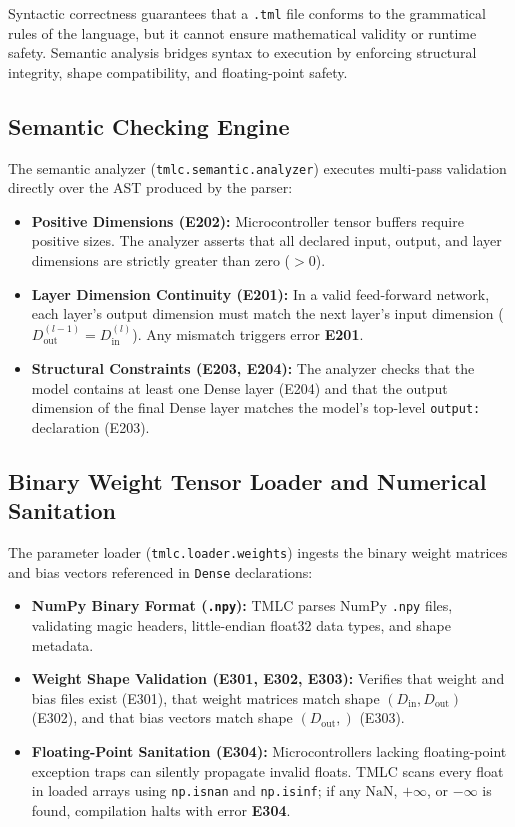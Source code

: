 \documentclass[11pt,a4paper]{article}
\begin{document}
Syntactic correctness guarantees that a \texttt{.tml} file conforms to the grammatical rules of the language, but it cannot ensure mathematical validity or runtime safety. Semantic analysis bridges syntax to execution by enforcing structural integrity, shape compatibility, and floating-point safety.

\subsection{Semantic Checking Engine}
The semantic analyzer (\texttt{tmlc.semantic.analyzer}) executes multi-pass validation directly over the AST produced by the parser:
\begin{itemize}[leftmargin=*]
    \item \textbf{Positive Dimensions (E202):} Microcontroller tensor buffers require positive sizes. The analyzer asserts that all declared input, output, and layer dimensions are strictly greater than zero ($> 0$).
    \item \textbf{Layer Dimension Continuity (E201):} In a valid feed-forward network, each layer's output dimension must match the next layer's input dimension ($D_{\text{out}}^{(l-1)} = D_{\text{in}}^{(l)}$). Any mismatch triggers error \textbf{E201}.
    \item \textbf{Structural Constraints (E203, E204):} The analyzer checks that the model contains at least one Dense layer (E204) and that the output dimension of the final Dense layer matches the model's top-level \texttt{output:} declaration (E203).
\end{itemize}

\subsection{Binary Weight Tensor Loader and Numerical Sanitation}
The parameter loader (\texttt{tmlc.loader.weights}) ingests the binary weight matrices and bias vectors referenced in \texttt{Dense} declarations:
\begin{itemize}[leftmargin=*]
    \item \textbf{NumPy Binary Format (\texttt{.npy}):} TMLC parses NumPy \texttt{.npy} files, validating magic headers, little-endian float32 data types, and shape metadata.
    \item \textbf{Weight Shape Validation (E301, E302, E303):} Verifies that weight and bias files exist (E301), that weight matrices match shape $(D_{\text{in}}, D_{\text{out}})$ (E302), and that bias vectors match shape $(D_{\text{out}},)$ (E303).
    \item \textbf{Floating-Point Sanitation (E304):} Microcontrollers lacking floating-point exception traps can silently propagate invalid floats. TMLC scans every float in loaded arrays using \texttt{np.isnan} and \texttt{np.isinf}; if any $\text{NaN}$, $+\infty$, or $-\infty$ is found, compilation halts with error \textbf{E304}.
\end{itemize}
\end{document}
